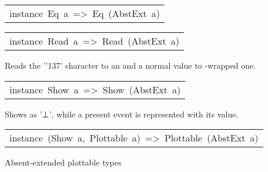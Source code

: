 \begin{haddockdesc}
\item[\begin{tabular}{@{}l}
instance\ Eq\ a\ =>\ Eq\ (AbstExt\ a)
\end{tabular}]
\end{haddockdesc}
\begin{haddockdesc}
\item[\begin{tabular}{@{}l}
instance\ Read\ a\ =>\ Read\ (AbstExt\ a)
\end{tabular}]\haddockbegindoc
Reads the '{\char '137}' character to an  and a normal value to
 -wrapped one.\par

\end{haddockdesc}
\begin{haddockdesc}
\item[\begin{tabular}{@{}l}
instance\ Show\ a\ =>\ Show\ (AbstExt\ a)
\end{tabular}]\haddockbegindoc
Shows  as '⊥', while a present event is represented
 with its value.\par

\end{haddockdesc}
\begin{haddockdesc}
\item[\begin{tabular}{@{}l}
instance\ (Show\ a,\ Plottable\ a)\ =>\ Plottable\ (AbstExt\ a)
\end{tabular}]\haddockbegindoc
Absent-extended plottable types\par

\end{haddockdesc}